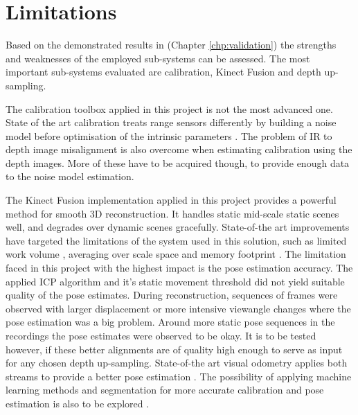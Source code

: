 \documentclass{ucl_thesis}
\newcommand{\chpref}[1]{(Chapter \ref{#1})}
\begin{document}
\section{Limitations} 
\label{sec:limitations}

\par Based on the demonstrated results in \chpref{chp:validation} the strengths and weaknesses of the employed sub-systems can be assessed. The most important sub-systems evaluated are calibration, Kinect Fusion and depth up-sampling.
\par The calibration toolbox applied in this project is not the most advanced one. State of the art calibration treats range sensors differently by building a noise model before optimisation of the intrinsic parameters \citep{calibration_herrera}. The problem of IR to depth image misalignment is also overcome when estimating calibration using the depth images. More of these have to be acquired though, to provide enough data to the noise model estimation.
\par The Kinect Fusion implementation applied in this project provides a powerful method for smooth 3D reconstruction. It handles static mid-scale static scenes well, and degrades over dynamic scenes gracefully. State-of-the art improvements have targeted the limitations of the system used in this solution, such as limited work volume \citep{Whelan13iros}, averaging over scale space \citep{Fuhrmann:2011} and memory footprint \citep{keller13realtime}. The limitation faced in this project with the highest impact is the pose estimation accuracy. The applied ICP algorithm and it's static movement threshold did not yield suitable quality of the pose estimates. During reconstruction, sequences of frames were observed with larger displacement or more intensive viewangle changes where the pose estimation was a big problem. Around more static pose sequences in the recordings the pose estimates were observed to be okay. It is to be tested however, if these better alignments are of quality high enough to serve as input for any chosen depth up-sampling. State-of-the art visual odometry applies both streams to provide a better pose estimation \citep{Whelan13icra}. The possibility of applying machine learning methods and segmentation for more accurate calibration and pose estimation is also to be explored \citep{malisiewicz-iccv11}.
\end{document}

